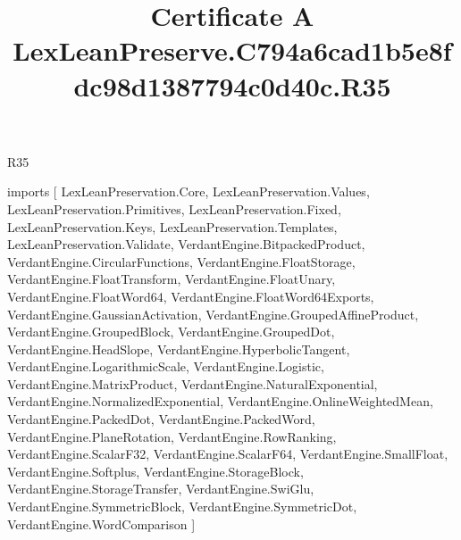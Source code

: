 \begin{lexlean}{R35}
\title{Certificate A LexLeanPreserve.C794a6cad1b5e8fdc98d1387794c0d40c.R35}
\begin{coremodule}
imports [
  LexLeanPreservation.Core,
  LexLeanPreservation.Values,
  LexLeanPreservation.Primitives,
  LexLeanPreservation.Fixed,
  LexLeanPreservation.Keys,
  LexLeanPreservation.Templates,
  LexLeanPreservation.Validate,
  VerdantEngine.BitpackedProduct,
  VerdantEngine.CircularFunctions,
  VerdantEngine.FloatStorage,
  VerdantEngine.FloatTransform,
  VerdantEngine.FloatUnary,
  VerdantEngine.FloatWord64,
  VerdantEngine.FloatWord64Exports,
  VerdantEngine.GaussianActivation,
  VerdantEngine.GroupedAffineProduct,
  VerdantEngine.GroupedBlock,
  VerdantEngine.GroupedDot,
  VerdantEngine.HeadSlope,
  VerdantEngine.HyperbolicTangent,
  VerdantEngine.LogarithmicScale,
  VerdantEngine.Logistic,
  VerdantEngine.MatrixProduct,
  VerdantEngine.NaturalExponential,
  VerdantEngine.NormalizedExponential,
  VerdantEngine.OnlineWeightedMean,
  VerdantEngine.PackedDot,
  VerdantEngine.PackedWord,
  VerdantEngine.PlaneRotation,
  VerdantEngine.RowRanking,
  VerdantEngine.ScalarF32,
  VerdantEngine.ScalarF64,
  VerdantEngine.SmallFloat,
  VerdantEngine.Softplus,
  VerdantEngine.StorageBlock,
  VerdantEngine.StorageTransfer,
  VerdantEngine.SwiGlu,
  VerdantEngine.SymmetricBlock,
  VerdantEngine.SymmetricDot,
  VerdantEngine.WordComparison
]


\end{coremodule}
\end{lexlean}
